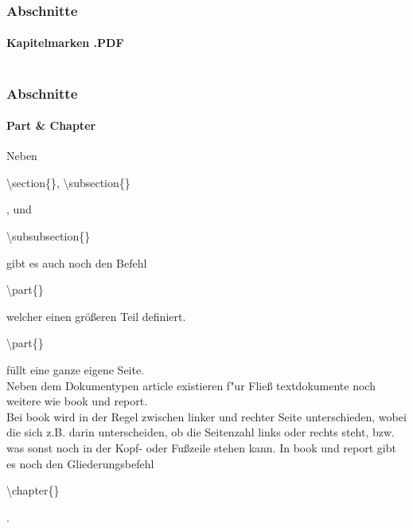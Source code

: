 \begin{frame}
\frametitle{Abschnitte}
\framesubtitle{Kapitelmarken .PDF}
\begin{columns}
\begin{column}{0.45\textwidth}
\begin{ttfamily}\scriptsize

\end{ttfamily}
\end{column}
\begin{column}{0.55\textwidth}
\end{column}
\end{columns}
\end{frame}


\begin{frame}
\frametitle{Abschnitte}
\framesubtitle{Part \& Chapter}
Neben \begin{ttfamily}\color{unibablueI}\textbackslash section\color{black}\{\},
\color{unibablueI}\textbackslash subsection\color{black}\{\}\end{ttfamily}, und \begin{ttfamily}\color{unibablueI}\textbackslash subsubsection\color{black}\{\}\end{ttfamily} gibt es auch noch den Befehl
 \begin{ttfamily}\color{unibablueI}\textbackslash part\color{black}\{\}\end{ttfamily} welcher einen größeren Teil definiert.
\begin{ttfamily}\color{unibablueI}\textbackslash part\color{black}\{\}\end{ttfamily} füllt eine ganze eigene Seite.\\
Neben dem Dokumentypen {\ttfamily article} existieren f"ur Flie\ss
textdokumente noch weitere wie {\ttfamily book} und {\ttfamily report}.\\
Bei {\ttfamily book} wird in der Regel zwischen linker und rechter Seite
unterschieden, wobei die sich z.B. darin unterscheiden, ob die Seitenzahl links oder rechts steht, bzw. was sonst noch in der Kopf- oder Fußzeile stehen kann.
In {\ttfamily book} und {\ttfamily report} gibt es noch den
Gliederungsbefehl \begin{ttfamily}\color{unibablueI}\textbackslash chapter\color{black}\{\}\end{ttfamily}.

\end{frame}


